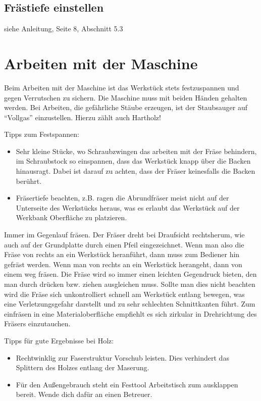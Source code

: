 \documentclass{\basedir/fablab-document}
\begin{document}
\subsection{Frästiefe einstellen}
siehe Anleitung, Seite 8, Abschnitt 5.3

\section{Arbeiten mit der Maschine}
Beim Arbeiten mit der Maschine ist das Werkstück stets festzuspannen und gegen Verrutschen zu sichern. Die Maschine muss mit beiden Händen gehalten werden. Bei Arbeiten, die gefährliche Stäube erzeugen, ist der Staubsauger auf ``Vollgas'' einzustellen. Hierzu zählt auch Hartholz!

Tipps zum Festspannen:
\begin{itemize}
    \item Sehr kleine Stücke, wo Schraubzwingen das arbeiten mit der Fräse behindern, im Schraubstock so einspannen, dass das Werkstück knapp über die Backen hinausragt. Dabei ist darauf zu achten, dass der Fräser keinesfalls die Backen berührt.
    \item Fräsertiefe beachten, z.B. ragen die Abrundfräser meist nicht auf der Unterseite des Werkstücks heraus, was es erlaubt das Werkstück auf der Werkbank Oberfläche zu platzieren.
\end{itemize}

Immer im Gegenlauf fräsen. Der Fräser dreht bei Draufsicht rechtsherum, wie auch auf der Grundplatte durch einen Pfeil eingezeichnet. Wenn man also die Fräse von rechts an ein Werkstück heranführt, dann muss zum Bediener hin gefräst werden. Wenn man von rechts an ein Werkstück herangeht, dann von einem weg fräsen. Die Fräse wird so immer einen leichten Gegendruck bieten, den man durch drücken bzw. ziehen ausgleichen muss. Sollte man dies nicht beachten wird die Fräse sich unkontrolliert schnell am Werkstück entlang bewegen, was eine Verletzungsgefahr darstellt und zu sehr schlechten Schnittkanten führt. Zum einfräsen in eine Materialoberfläche empfiehlt es sich zirkular in Drehrichtung des Fräsers einzutauchen.

Tipps für gute Ergebnisse bei Holz:
\begin{itemize}
    \item Rechtwinklig zur Faserstruktur Vorschub leisten. Dies verhindert das Splittern des Holzes entlang der Maserung.
    \item Für den Außengebrauch steht ein Festtool Arbeitstisch zum ausklappen bereit. Wende dich dafür an einen Betreuer.
\end{itemize}
\end{document}
